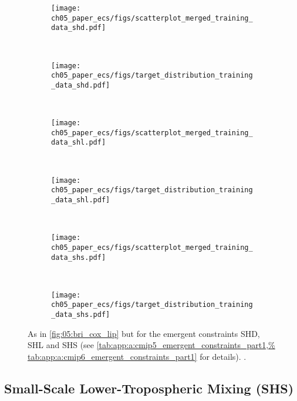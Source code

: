\begin{figure}[!t]
  \centering
  \begin{subfigure}[b]{\SubfigureWidth{}}
    \texttt{[image: 
      ch05\_paper\_ecs/figs/scatterplot\_merged\_training\_data\_shd.pdf]}
    \caption{}
    \label{fig:05:shd_shl_shs:a}
  \end{subfigure}
  ~
  \begin{subfigure}[b]{\SubfigureWidth{}}
    \texttt{[image: 
      ch05\_paper\_ecs/figs/target\_distribution\_training\_data\_shd.pdf]}
    \caption{}
    \label{fig:05:shd_shl_shs:b}
  \end{subfigure}
  \\
  \begin{subfigure}[b]{\SubfigureWidth{}}
    \texttt{[image: 
      ch05\_paper\_ecs/figs/scatterplot\_merged\_training\_data\_shl.pdf]}
    \caption{}
    \label{fig:05:shd_shl_shs:c}
  \end{subfigure}
  ~
  \begin{subfigure}[b]{\SubfigureWidth{}}
    \texttt{[image: 
      ch05\_paper\_ecs/figs/target\_distribution\_training\_data\_shl.pdf]}
    \caption{}
    \label{fig:05:shd_shl_shs:d}
  \end{subfigure}
  \\
  \begin{subfigure}[b]{\SubfigureWidth{}}
    \texttt{[image: 
      ch05\_paper\_ecs/figs/scatterplot\_merged\_training\_data\_shs.pdf]}
    \caption{}
    \label{fig:05:shd_shl_shs:e}
  \end{subfigure}
  ~
  \begin{subfigure}[b]{\SubfigureWidth{}}
    \texttt{[image: 
      ch05\_paper\_ecs/figs/target\_distribution\_training\_data\_shs.pdf]}
    \caption{}
    \label{fig:05:shd_shl_shs:f}
  \end{subfigure}
  \caption[
    As in \cref{fig:05:bri_cox_lip} but for the emergent constraints SHD, SHL
    and SHS.
  ]{
    As in \cref{fig:05:bri_cox_lip} but for the emergent constraints SHD, SHL
    and SHS (see \cref{tab:app:a:cmip5_emergent_constraints_part1,%
      tab:app:a:cmip6_emergent_constraints_part1} for details).
    .
  }
  \label{fig:05:shd_shl_shs}
\end{figure}


\subsection{Small-Scale Lower-Tropospheric Mixing (SHS)}
\label{subsec:05:shs}

